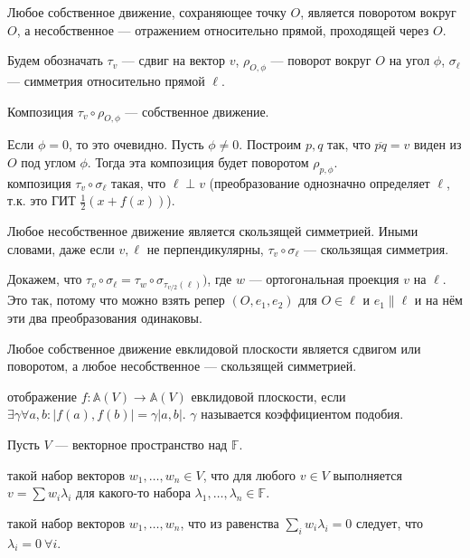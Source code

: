 \documentclass[12pt,a4paper]{article}
\begin{document}
\lemma Любое собственное движение, сохраняющее точку $O$, является поворотом вокруг $O$, а несобственное --- отражением относительно прямой, проходящей через $O$.

Будем обозначать $\tau_v$ --- сдвиг на вектор $v$, $\rho_{O,\phi}$ --- поворот вокруг $O$ на угол $\phi$, $\sigma_\ell$ --- симметрия относительно прямой $\ell$.

\lemma Композиция $\tau_v\circ \rho_{O,\phi}$ --- собственное движение.

\proof Если $\phi=0$, то это очевидно. Пусть $\phi\neq 0$. Построим $p,q$ так, что $\overline{pq}=v$ виден из $O$ под углом $\phi$. Тогда эта композиция будет поворотом $\rho_{p,\phi}$.\QEDA\\

 композиция $\tau_v\circ \sigma_\ell$ такая, что $\ell\perp v$ (преобразование однозначно определяет $\ell$, т.к. это ГИТ $\frac{1}{2}(x+f(x))$).

\lemma Любое несобственное движение является скользящей симметрией. Иными словами, даже если $v,\ell$ не перпендикулярны, $\tau_v\circ \sigma_\ell$ --- скользящая симметрия.

\proof Докажем, что $\tau_v\circ \sigma_\ell = \tau_w\circ\sigma_{\tau_{v /2}(\ell)})$, где $w$ --- ортогональная проекция $v$ на $\ell$. Это так, потому что можно взять репер $(O,e_1,e_2)$ для $O\in\ell$ и $e_1\parallel \ell$ и на нём эти два преобразования одинаковы.\QEDA

 Любое собственное движение евклидовой плоскости является сдвигом или поворотом, а любое несобственное --- скользящей симметрией. 

 отображение $f:\mathbb A (V)\to \mathbb A (V)$ евклидовой плоскости, если $\exists \gamma\forall a,b:|f(a),f(b)|=\gamma|a,b|$. $\gamma$ называется коэффициентом подобия.\\

\newpage


Пусть $V$ --- векторное пространство над $\mathbb F $.

 такой набор векторов $w_1,\ldots ,w_n\in V$, что для любого $v\in V$ выполняется $v=\sum w_i\lambda_i$ для какого-то набора $\lambda_1,\ldots ,\lambda_n\in \mathbb F $.

 такой набор векторов $w_1,\ldots ,w_n$, что из равенства $\sum_i w_i\lambda_i=0$ следует, что $\lambda_i=0\ \forall i$.
\end{document}
